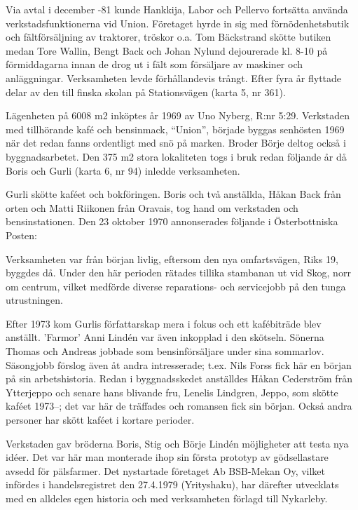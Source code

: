 Via avtal i december -81 kunde Hankkija, Labor och Pellervo fortsätta använda verkstadsfunktionerna vid Union.
Företaget hyrde in sig med förnödenhetsbutik och fältförsäljning av traktorer, tröskor o.a. Tom Bäckstrand skötte butiken medan Tore	Wallin, Bengt Back och Johan Nylund dejourerade kl. 8-10 på förmiddagarna innan de drog ut i fält som försäljare av maskiner och anläggningar. Verksamheten levde förhållandevis trångt. Efter fyra år flyttade delar av den till finska skolan på Stationsvägen (karta 5,  nr 361).



Lägenheten på 6008 m2 inköptes år 1969 av Uno Nyberg, R:nr 5:29. Verkstaden med tillhörande kafé och bensinmack, ``Union'', började	byggas senhösten 1969 när det redan fanns ordentligt med snö på marken. Broder Börje deltog också i byggnadsarbetet. Den 375 m2 stora lokaliteten togs i bruk redan följande år då Boris och Gurli	(karta 6, nr 94) inledde verksamheten.

Gurli skötte kaféet och bokföringen. Boris och två anställda, Håkan Back från orten och Matti Riikonen från Oravais, tog hand om verkstaden och bensinstationen. Den 23 oktober 1970 annonserades följande i Österbottniska Posten:


Verksamheten var från början livlig, eftersom den nya omfartsvägen, Riks 19, byggdes då. Under den här perioden rätades  tillika stambanan ut vid Skog, norr om centrum, vilket medförde diverse reparations- och servicejobb på den tunga utrustningen.

Efter 1973 kom Gurlis författarskap mera i fokus och ett kafébiträde blev anställt. 'Farmor' Anni Lindén var även inkopplad i den skötseln. Sönerna Thomas och Andreas jobbade som bensinförsäljare under sina sommarlov. Säsongjobb förslog även åt andra intresserade; t.ex. Nils Forss fick här en början på sin arbetshistoria. Redan i byggnadsskedet anställdes Håkan Cederström från Ytterjeppo och	senare hans blivande fru, Lenelis Lindgren, Jeppo, som skötte kaféet	1973--; det var här de träffades och romansen fick sin början.	Också andra personer har skött kaféet i kortare perioder.

Verkstaden gav bröderna Boris, Stig och Börje Lindén möjligheter att testa nya idéer. Det var här man monterade ihop sin första prototyp	av gödsellastare avsedd för pälsfarmer. Det nystartade företaget Ab	BSB-Mekan Oy, vilket infördes i handelsregistret den 27.4.1979 (Yrityshaku), har därefter utvecklats med en alldeles egen historia och med verksamheten förlagd till Nykarleby.



